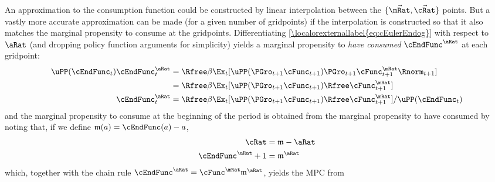 \documentclass[\econtexRoot/BufferStockTheory]{subfiles}
\begin{document}
An approximation to the consumption function could be constructed by
linear interpolation between the $\{\vec{\mRat},\vec{\cRat}\}$ points.
But a vastly more accurate approximation can be made (for a given
number of gridpoints) if the interpolation is constructed so that it
also matches the marginal propensity to consume at the gridpoints. Differentiating \eqref{\localorexternallabel{eq:cEulerEndog}}
with respect to $\aRat$ (and dropping policy function arguments for
simplicity) yields a marginal propensity to {\it have consumed} $\cEndFunc^{\aRat}$ at
each gridpoint:
\begin{equation}\begin{gathered}\begin{aligned}
\uPP(\cEndFunc_{t})\cEndFunc_{t}^{\aRat}  & = \Rfree \beta \Ex_{t}[\uPP(\PGro_{t+1} \cFunc_{t+1})\PGro_{t+1} \cFunc^{\mRat}_{t+1}\Rnorm_{t+1}] \notag
\\  & = \Rfree \beta \Ex_{t}[\uPP(\PGro_{t+1} \cFunc_{t+1}) \Rfree \cFunc^{\mRat}_{t+1}] \notag
\\ \cEndFunc_{t}^{\aRat}  & = \Rfree \beta \Ex_{t}[\uPP(\PGro_{t+1}  \cFunc_{t+1}) \Rfree \cFunc^{\mRat}_{t+1}]/\uPP(\cEndFunc_{t}) \label{eq:MPTHC}
\end{aligned}\end{gathered}\end{equation}
and the marginal propensity to consume at the beginning of the period is obtained from the marginal
propensity to have consumed by noting that, if we define $\mathfrak{m}(a) = \cEndFunc(a)-a$,
\begin{align*}
   \cRat  & = \mathfrak{m}-\aRat
\\ \cEndFunc^{\aRat}+1  & = \mathfrak{m}^{\aRat}
\end{align*}
which, together with the chain rule $\cEndFunc^{\aRat}  = \cFunc^{\mRat}\mathfrak{m}^{\aRat}$,
yields the MPC from
\end{document}
